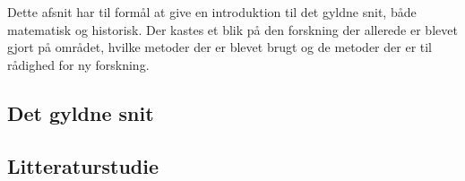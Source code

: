 \textsf{
Dette afsnit har til formål at give en introduktion til det gyldne snit,
både matematisk og historisk. Der kastes et blik på den forskning der
allerede er blevet gjort på området, hvilke metoder der er blevet brugt
og de metoder der er til rådighed for ny forskning.
}

\subsection{Det gyldne snit}


\subsection{Litteraturstudie}


